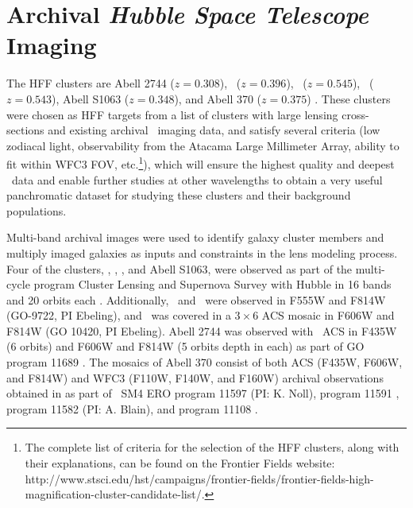 \section{Archival \emph{Hubble Space Telescope} Imaging}
\label{chap2:sec:HSTimaging}

The HFF clusters are Abell 2744 ($z=0.308$), \MACSzerofour\ ($z=0.396$), \MACSzeroseven\ ($z=0.545$), \MACSeleven\ ($z=0.543$), Abell S1063 ($z=0.348$), and Abell 370 ($z=0.375$) \citep{Babyk:2012fj,Mann:2012fr,Ebeling:2007ys,Ebeling:2001rt,Bohringer:2004wd,White:2000nx,Struble:1987cr,Abell:1989ly,Abell:1958mz}. These clusters were chosen as HFF targets from a list of clusters with large lensing cross-sections and existing archival \hst\ imaging data, and satisfy several criteria (low zodiacal light, observability from the Atacama Large Millimeter Array, ability to fit within WFC3 FOV, etc.\footnote{The complete list of criteria for the selection of the HFF clusters, along with their explanations, can be found on the Frontier Fields website: http://www.stsci.edu/hst/campaigns/frontier-fields/frontier-fields-high-magnification-cluster-candidate-list/.}), which will ensure the highest quality and deepest \hst\ data and enable further studies at other wavelengths to obtain a very useful panchromatic dataset for studying these clusters and their background populations.

Multi-band archival images were used to identify galaxy cluster members and multiply imaged galaxies as inputs and constraints in the lens modeling process.  Four of the clusters, \MACSzerofour, \MACSzeroseven, \MACSeleven, and Abell S1063, were observed as part of the multi-cycle program Cluster Lensing and Supernova Survey with Hubble in 16 bands and 20 orbits each \citep[CLASH; PI: M. Postman; see][]{Postman:2012lr}. Additionally, \MACSzeroseven\ and \MACSeleven\ were observed in F555W and F814W (GO-9722, PI Ebeling), and \MACSzeroseven\ was covered in a $3\times6$ ACS mosaic in F606W and F814W (GO 10420, PI Ebeling). Abell 2744 was observed with \hst\ ACS in F435W (6 orbits) and F606W and F814W (5 orbits depth in each) as part of GO program 11689 \citep[PI: R. Dupke; ][]{Merten:2011fk}. The mosaics of Abell 370 consist of both ACS (F435W, F606W, and F814W) and WFC3 (F110W, F140W, and F160W) archival observations obtained in  as part of \hst\ SM4 ERO program 11597 (PI: K. Noll), program 11591 \citep[PI: J.-P. Kneib;][]{Richard:2010wd}, program 11582 (PI: A. Blain), and program 11108 \citep[PI. E. Hu; ][]{Cowie:2011lr}. 

